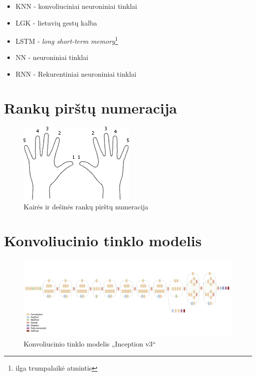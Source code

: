 \documentclass{VUMIFPSbakalaurinis}
\begin{document}
\begin{itemize}
	\item KNN - konvoliuciniai neuroniniai tinklai
	\item LGK - lietuvių gestų kalba
	\item LSTM - \textit{long short-term memory}\footnote{ilga trumpalaikė atmintis}
	\item NN - neuroniniai tinklai
	\item RNN - Rekurentiniai neuroniniai tinklai
\end{itemize}

\appendix  %

\section{Rankų pirštų numeracija}
\label{appendix:pirstai}
\begin{figure}[H]
    \centering
    \includegraphics[scale=1]{img/fingers}
    \caption{Kairės ir dešinės rankų pirštų numeracija}
    \label{img:fingers}
\end{figure}

\section{Konvoliucinio tinklo modelis}
\label{appendix:inception_v3}
\begin{figure}[H]
	\centering
	\includegraphics[scale=0.2]{img/inception_v3}
	\caption{Konvoliucinio tinklo modelis „Inception v3“}
	\label{img:inception_v3}
\end{figure}
\end{document}
